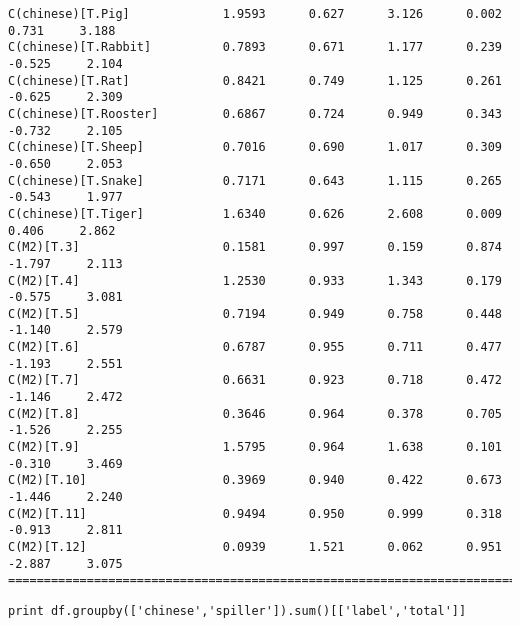 \documentclass[12pt,fleqn]{article}\usepackage{../common}
\begin{document}
\begin{verbatim}
C(chinese)[T.Pig]             1.9593      0.627      3.126      0.002         0.731     3.188
C(chinese)[T.Rabbit]          0.7893      0.671      1.177      0.239        -0.525     2.104
C(chinese)[T.Rat]             0.8421      0.749      1.125      0.261        -0.625     2.309
C(chinese)[T.Rooster]         0.6867      0.724      0.949      0.343        -0.732     2.105
C(chinese)[T.Sheep]           0.7016      0.690      1.017      0.309        -0.650     2.053
C(chinese)[T.Snake]           0.7171      0.643      1.115      0.265        -0.543     1.977
C(chinese)[T.Tiger]           1.6340      0.626      2.608      0.009         0.406     2.862
C(M2)[T.3]                    0.1581      0.997      0.159      0.874        -1.797     2.113
C(M2)[T.4]                    1.2530      0.933      1.343      0.179        -0.575     3.081
C(M2)[T.5]                    0.7194      0.949      0.758      0.448        -1.140     2.579
C(M2)[T.6]                    0.6787      0.955      0.711      0.477        -1.193     2.551
C(M2)[T.7]                    0.6631      0.923      0.718      0.472        -1.146     2.472
C(M2)[T.8]                    0.3646      0.964      0.378      0.705        -1.526     2.255
C(M2)[T.9]                    1.5795      0.964      1.638      0.101        -0.310     3.469
C(M2)[T.10]                   0.3969      0.940      0.422      0.673        -1.446     2.240
C(M2)[T.11]                   0.9494      0.950      0.999      0.318        -0.913     2.811
C(M2)[T.12]                   0.0939      1.521      0.062      0.951        -2.887     3.075
=============================================================================================
\end{verbatim}

\begin{verbatim}
print df.groupby(['chinese','spiller']).sum()[['label','total']]
\end{verbatim}
\end{document}
